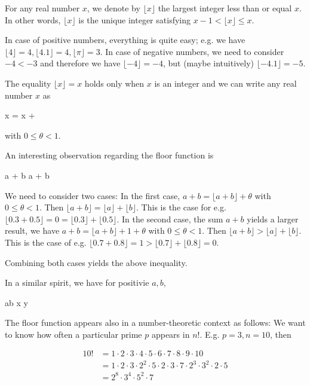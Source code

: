 
For any real number $x$, we denote by $\lfloor x \rfloor$ the largest integer less than or equal $x$. In other words, $\lfloor x \rfloor$ is the unique integer satisfying $x-1 < \lfloor x \rfloor \leq x$.

In case of positive numbers, everything is quite easy; e.g. we have $\lfloor 4 \rfloor = 4, \lfloor 4.1 \rfloor = 4, \lfloor \pi \rfloor = 3$. In case of negative numbers, we need to consider $-4 < -3$ and therefore we have $\lfloor -4 \rfloor = -4$, but (maybe intuitively) $\lfloor -4.1 \rfloor = -5$.

The equality $\lfloor x \rfloor = x$ holds only when $x$ is an integer and we can write any real number $x$ as

\bee
x = \lfloor x \rfloor + \theta
\eee

with $0 \leq \theta < 1$.

An interesting observation regarding the floor function is

\bee
\lfloor a + b \rfloor \geq \lfloor a \rfloor + \lfloor b \rfloor
\eee

We need to consider two cases: In the first case, $a + b = \lfloor a + b \rfloor + \theta$ with $0 \leq \theta < 1$. Then $\lfloor a+b \rfloor = \lfloor a \rfloor + \lfloor b \rfloor$. This is the case for e.g. $\lfloor 0.3 + 0.5 \rfloor = 0 = \lfloor 0.3 \rfloor + \lfloor 0.5 \rfloor$. In the second case, the sum $a + b$ yields a larger result, we have $a + b = \lfloor a + b\rfloor + 1 + \theta$ with $0 \leq \theta < 1$. Then $\lfloor a + b \rfloor > \lfloor a \rfloor + \lfloor b \rfloor$. This is the case of e.g. $\lfloor 0.7 + 0.8 \rfloor = 1 > \lfloor 0.7 \rfloor + \lfloor 0.8 \rfloor = 0$.

Combining both cases yields the above inequality.

In a similar spirit, we have for positivie $a, b$,

\bee
\lfloor ab \rfloor \geq \lfloor x \rfloor \lfloor y \rfloor
\eee

The floor function appears also in a number-theoretic context as follows: We want to know how often a particular prime $p$ appears in $n!$. E.g. $p = 3, n = 10$, then

\begin{align*}
    10! &= 1 \cdot 2 \cdot 3 \cdot 4 \cdot 5 \cdot 6 \cdot 7 \cdot 8 \cdot 9 \cdot 10 \\
    &= 1 \cdot 2 \cdot 3 \cdot 2^2 \cdot 5 \cdot 2 \cdot 3 \cdot 7 \cdot 2^3 \cdot 3^2 \cdot 2 \cdot 5 \\
    &= 2^8 \cdot 3^4 \cdot 5^2 \cdot 7
\end{align*}

